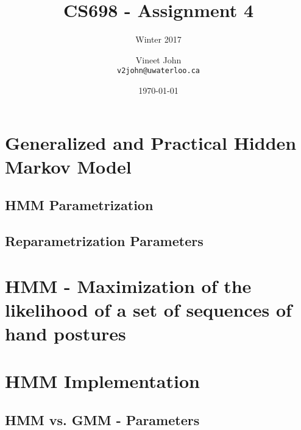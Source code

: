 \documentclass[parskip=half]{scrartcl}
\begin{document}
\title{CS698 - Assignment 4}
\subtitle{Winter 2017}
\author{
    Vineet John\\
    \texttt{v2john@uwaterloo.ca}
}
\date{\today}
\maketitle


\section{Generalized and Practical Hidden Markov Model} %
\label{sec:generalized_and_practical_hidden_markov_model}


    \subsection{HMM Parametrization} %
    \label{sub:hmm_parametrization}
    


    \subsection{Reparametrization Parameters} %
    \label{sub:reparametrization_parameters}
    




\section{HMM - Maximization of the likelihood of a set of sequences of hand postures} %
\label{sec:hmm_maximization_of_the_likelihood_of_a_set_of_sequences_of_hand_postures}



\section{HMM Implementation} %
\label{sec:hmm_implementation}


    \subsection{HMM vs. GMM - Parameters} %
    \label{sub:hmm_vs_gmm_parameters}
\end{document}
